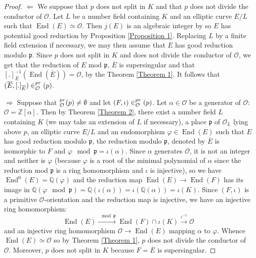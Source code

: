 \documentclass[a4paper,10pt,notitlepage]{report}
\theoremstyle{definition}
\theoremstyle{plain}
\theoremstyle{definition}
\newcommand{\Z}{\mathbb{Z}}
\newcommand{\Q}{\mathbb{Q}}
\newcommand{\mO}{\mathcal{O}}
\renewcommand{\(}{\left(}
\renewcommand{\)}{\right)}
\newcommand{\mfp}{\mathfrak{p}}
\DeclareMathOperator{\End}{End}
\let\SS\relax
\DeclareMathOperator{\SS}{SS}
\begin{document}
\begin{proof}
$\Longleftarrow$ We suppose that $p$ does not split in $K$ and that $p$ does not divide the conductor of $\mO$.  Let $L$ be a number field containing $K$ and an elliptic curve $E/L$ such that $\End(E)\simeq \mO$. Then $j(E)$ is an algebraic integer by \cite[Theorem II.6.1]{Silverman2} so $E$ has potential good reduction by Proposition \ref{Proposition 1}. Replacing $L$ by a finite field extension if necessary, we may then assume that $E$ has good reduction modulo $\mfp$.  Since $p$ does not split in $K$ and does not divide the conductor of $\mO$, we get that the reduction of $E$ mod $\mfp$, $\overline{E}$ is supersingular and that $[.]_{\overline{E}}^{-1}(\End(\overline{E}))=\mO$, by the Theorem \ref{Theorem 1}. It follows that $(\overline{E}, [.]_{\overline{E}})\in\SS_{\mO}^{pr}(p)$.

$\Longrightarrow$ Suppose that $\SS_{\mO}^{pr}(p)\neq\emptyset$ and let $(F,\iota)\in\SS_{\mO}^{pr}(p)$. Let $\alpha\in \mO$ be a generator of $\mO$: $\mO=\Z[\alpha]$. Then by Theorem \ref{Theorem 2}, there exist a number field $L$ containing $K$ (we may take an extension of $L$ if necessary), a place $\mfp$ of $\mO_L$ lying above $p$, an elliptic curve $E/L$ and an endomorphism $\varphi\in\End(E)$ such that $E$ has good reduction modulo $\mfp$, the reduction modulo $\mfp$,  denoted by $\overline{E}$ is isomorphic to $F$ and $\varphi \mod \mfp= \iota(\alpha)$.  Since $\alpha$ generates $\mO$, it is not an integer and neither is $\varphi$ (because $\varphi$ is a root of the minimal polynomial of $\alpha$ since the reduction mod $\mfp$ is a ring homomorphism and $\iota$ is injective), so we have $\End^0(E)=\Q(\varphi)$ and the reduction map $\End(E)\longrightarrow\End(F)$ has its image in $\Q(\varphi \mod \mfp)=\Q(\iota(\alpha))=\iota(\Q(\alpha))=\iota(K)$.  Since $(F,\iota)$ is a primitive $\mO$-orientation and the reduction map is injective, we have an injective ring homomorphism:
\[\End(E)\overset{\mod \mfp}{\longrightarrow}\End(F)\cap\iota(K)\overset{\iota^{-1}}{\longrightarrow}\mO\]
and an injective ring homomorphism $\mO\longrightarrow\End(E)$ mapping $\alpha$ to $\varphi$. Whence $\End(E)\simeq \mO$ so by Theorem \ref{Theorem 1}, $p$ does not divide the conductor of $\mO$.  Moreover, $p$ does not split in $K$ because $F=\overline{E}$ is supersingular.
\end{proof}
\end{document}
